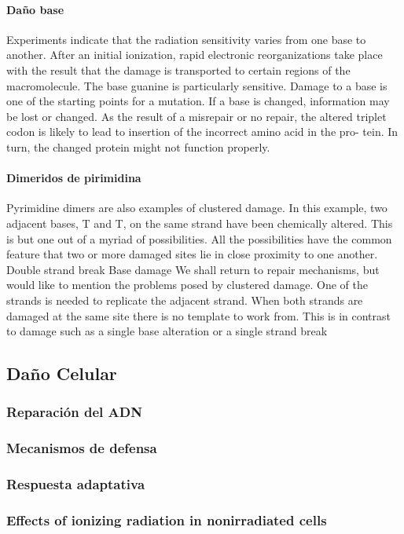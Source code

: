\paragraph{Daño base}
Experiments indicate that the radiation sensitivity varies from one base to another. After an initial ionization, rapid electronic reorganizations take place with the result that the damage is transported to certain regions of the macromolecule. The base guanine is particularly sensitive.
Damage to a base is one of the starting points for a mutation. If a base is changed, information may be lost or changed. As the result of a misrepair or no repair, the altered triplet codon is likely to lead to insertion of the incorrect amino acid in the pro- tein. In turn, the changed protein might not function properly.
\paragraph{Dimeridos de pirimidina}
Pyrimidine dimers are also examples of clustered damage. In this example, two adjacent bases, T and T, on the same strand have been chemically altered.
This is but one out of a
myriad of possibilities. All the possibilities have the common feature that two or more damaged sites lie in close proximity to one another.
Double strand break
Base damage
We shall return to repair mechanisms, but would like to mention the problems posed by clustered damage. One of the strands is needed to replicate the adjacent strand. When both strands are damaged at the same site there is no template to work from. This is in contrast to damage such as a single base alteration or a single strand break
\subsection{Daño Celular}
\subsubsection{Reparación del ADN}
\subsubsection{Mecanismos de defensa}
\subsubsection{Respuesta adaptativa}
\subsubsection{Effects of ionizing radiation in nonirradiated cells}
\cite{willmari}
